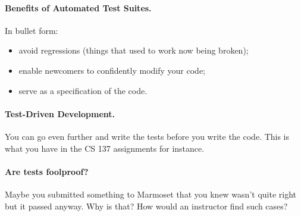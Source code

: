 \documentclass[11pt]{article}
\begin{document}
\paragraph{Benefits of Automated Test Suites.}
In bullet form:
\begin{itemize}
\item avoid regressions (things that used to work now being broken);
\item enable newcomers to confidently modify your code;
\item serve as a specification of the code.
\end{itemize}

\paragraph{Test-Driven Development.} You can go even further
and write the tests before you write the code. This is what you have
in the CS 137 assignments for instance.

\paragraph{Are tests foolproof?} Maybe you submitted something to
Marmoset that you knew wasn't quite right but it passed anyway.
Why is that? How would an instructor find such cases?
\end{document}
